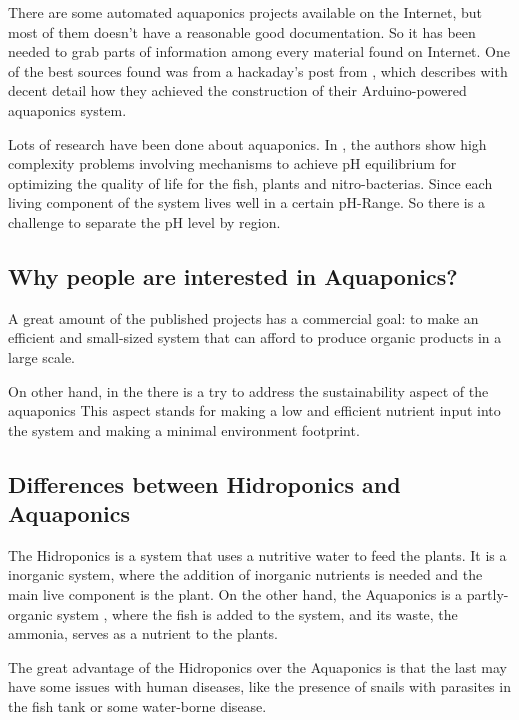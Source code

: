 There are some automated aquaponics projects available on the Internet,
but most of them doesn't have a reasonable good documentation.
So it has been needed to grab parts of information among every material found on Internet.
One of the best sources found was from a hackaday's post from \cite{gareth_coleman_aquapionics_2016},
which describes with decent detail how they achieved the construction of their Arduino-powered aquaponics system.

Lots of research have been done about aquaponics.
In \cite{goddek2015challenges}, the authors show high complexity problems involving mechanisms to achieve pH equilibrium for optimizing the quality of life for the fish, plants and nitro-bacterias.
Since each living component of the system lives well in a certain pH-Range.
So there is a challenge to separate the pH level by region.

\subsection{Why people are interested in Aquaponics?}

A great amount of the published projects has a commercial goal:
to make an efficient and small-sized system that can afford to produce organic products in a large scale.

On other hand,
in the \cite{goddek2015challenges} there is a try to address the sustainability aspect of the aquaponics
This aspect stands for making a low and efficient nutrient input into the system and making a minimal environment footprint.

\subsection{Differences between Hidroponics and Aquaponics}

The Hidroponics is a system that uses a nutritive water to feed the plants.
It is a inorganic system, 
where the addition of inorganic nutrients is needed and the main live component is the plant.
On the other hand, the Aquaponics is a partly-organic system \cite{},
where the fish is added to the system,
and its waste,
the ammonia,
serves as a nutrient to the plants.

The great advantage of the Hidroponics over the Aquaponics is that the last may have some issues with human diseases,
like the presence of snails with parasites in the fish tank or some water-borne disease.
